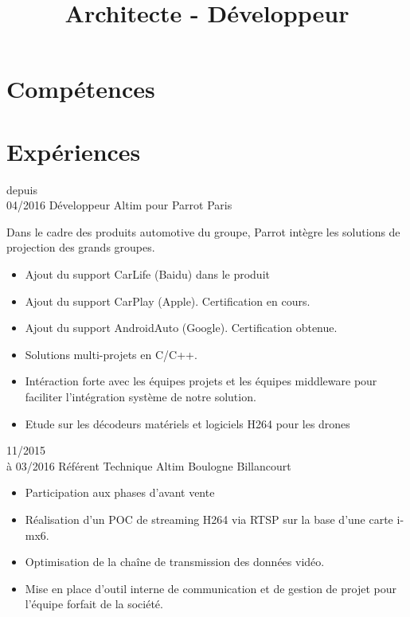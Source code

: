 \documentclass[10pt,a4paper]{moderncv}       %
\title{Architecte - Développeur}
\begin{document}
\maketitle

\section{Compétences}

\vspace*{5mm}
\section{Expériences}
\cventry
{depuis\\04/2016}   %
{Développeur}       %
{Altim pour Parrot} %
{Paris}             %
{}                  %
{
Dans le cadre des produits automotive du groupe, Parrot intègre les solutions de
projection des grands groupes.
\begin{itemize}
\setlength{\itemindent}{2mm}
  \item Ajout du support CarLife (Baidu) dans le produit
  \item Ajout du support CarPlay (Apple). Certification en cours.
  \item Ajout du support AndroidAuto (Google). Certification obtenue.
  \item Solutions multi-projets en C/C++.
  \item Intéraction forte avec les équipes projets et les équipes middleware
  pour faciliter l'intégration système de notre solution.
  \item Etude sur les décodeurs matériels et logiciels H264 pour les drones
\end{itemize}
}
\vspace*{3mm}
\cventry
{11/2015\\à 03/2016}   %
{Référent Technique}   %
{Altim}                %
{Boulogne Billancourt} %
{}                     %
{
\begin{itemize}
\setlength{\itemindent}{2mm}
  \item Participation aux phases d'avant vente
  \item Réalisation d'un POC de streaming H264 via RTSP sur la base d'une carte
  i-mx6.
  \item Optimisation de la chaîne de transmission des données vidéo.
  \item Mise en place d'outil interne de communication et de gestion de projet
  pour l'équipe forfait de la société.
\end{itemize}
}
\end{document}
